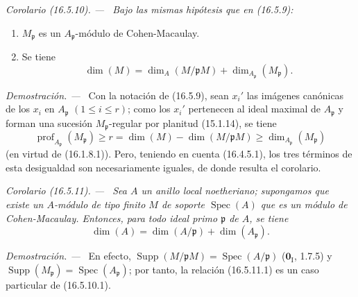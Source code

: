 \documentclass[10pt,oneside]{book}
\makeatletter
\newcommand{\setmanualcurrentlabel}[1]{\def\@currentlabel{#1}}
\newcommand{\oldpage}[2][]{%
  \setcounter{footnote}{0}%
  \marginpar{\scriptsize\textbf{#1}~|~#2}\ignorespaces}
\newenvironment{corollary}[1][]{%
  \setmanualcurrentlabel{#1}\par\medskip\noindent\itshape Corolario (#1). ---\ }{\par}
\newenvironment{proof}{%
  \par\medskip\noindent\textit{Demostración. ---\ }}{\par}
\providecommand{\setmin}{-}%
\makeatother
\begin{document}
\begin{corollary}[16.5.10]
\label{0.16.5.10-es}
Bajo las mismas hipótesis que en \textup{(16.5.9)}:
\begin{enumerate}
  \item[\textup{(i)}] $M_{\mathfrak{p}}$ es un $A_{\mathfrak{p}}$-módulo de
  Cohen-Macaulay.
  \item[\textup{(ii)}] Se tiene
  \begin{equation}
  \label{0.16.5.10.1-es}
  \tag{16.5.10.1}
    \dim(M)=\dim_A(M/\mathfrak{p}M)
    +\dim_{A_{\mathfrak{p}}}(M_{\mathfrak{p}}).
  \end{equation}
\end{enumerate}
\end{corollary}

\begin{proof}
Con la notación de (16.5.9), sean $x_i'$ las imágenes canónicas de los $x_i$
en $A_{\mathfrak{p}}$ $(1\leq i\leq r)$; como los $x_i'$ pertenecen al
ideal maximal de $A_{\mathfrak{p}}$ y forman una sucesión
$M_{\mathfrak{p}}$-regular por planitud (15.1.14), se tiene
\[
  \operatorname{prof}_{A_{\mathfrak{p}}}(M_{\mathfrak{p}})
  \geq r=\dim(M)\setmin\dim(M/\mathfrak{p}M)
  \geq\dim_{A_{\mathfrak{p}}}(M_{\mathfrak{p}})
\]
(en virtud de (16.1.8.1)). Pero, teniendo en cuenta (16.4.5.1), los tres
términos de esta desigualdad son necesariamente iguales, de donde resulta el corolario.
\end{proof}

\oldpage[0\textsubscript{IV-1}]{39}

\begin{corollary}[16.5.11]
\label{0.16.5.11-es}
Sea $A$ un anillo local noetheriano; supongamos que existe un $A$-módulo de
tipo finito $M$ de soporte $\operatorname{Spec}(A)$ que es un módulo de
Cohen-Macaulay. Entonces, para todo ideal primo $\mathfrak{p}$ de $A$, se tiene
\begin{equation}
\label{0.16.5.11.1-es}
\tag{16.5.11.1}
  \dim(A)=\dim(A/\mathfrak{p})+\dim(A_{\mathfrak{p}}).
\end{equation}
\end{corollary}

\begin{proof}
En efecto, $\operatorname{Supp}(M/\mathfrak{p}M)
=\operatorname{Spec}(A/\mathfrak{p})$ ($\mathbf{0}_{\mathrm I}$, 1.7.5) y
$\operatorname{Supp}(M_{\mathfrak{p}})
=\operatorname{Spec}(A_{\mathfrak{p}})$; por tanto, la relación (16.5.11.1) es un
caso particular de (16.5.10.1).
\end{proof}
\end{document}
